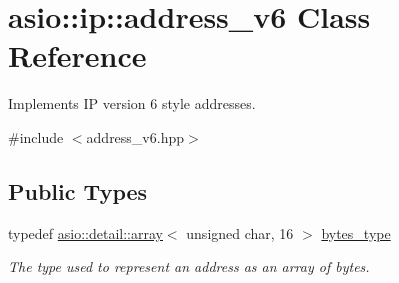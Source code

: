 \hypertarget{classasio_1_1ip_1_1address__v6}{}\section{asio\+:\+:ip\+:\+:address\+\_\+v6 Class Reference}
\label{classasio_1_1ip_1_1address__v6}


Implements I\+P version 6 style addresses.  




{\ttfamily \#include $<$address\+\_\+v6.\+hpp$>$}

\subsection*{Public Types}
\begin{DoxyCompactItemize}
\item 
typedef \hyperlink{classboost_1_1array}{asio\+::detail\+::array}$<$ unsigned char, 16 $>$ \hyperlink{classasio_1_1ip_1_1address__v6_a8a3e5d2312af4134087ad3ebdaad7881}{bytes\+\_\+type}
\begin{DoxyCompactList}\small\item\em The type used to represent an address as an array of bytes. \end{DoxyCompactList}\end{DoxyCompactItemize}
